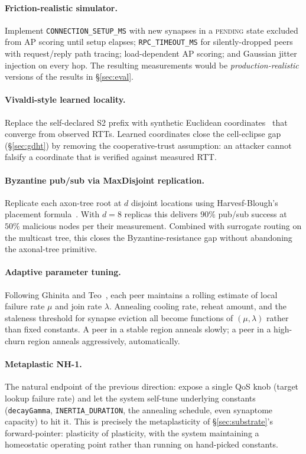\documentclass[conference]{IEEEtran}
\newcommand{\nhone}{NH-1\xspace}
\begin{document}
\paragraph{Friction-realistic simulator.} Implement
\texttt{CONNECTION\_SETUP\_MS} with new synapses in a
\textsc{pending} state excluded from AP scoring until setup elapses;
\texttt{RPC\_TIMEOUT\_MS} for silently-dropped peers with
request/reply path tracing; load-dependent AP scoring; and Gaussian
jitter injection on every hop. The resulting measurements would be
\emph{production-realistic} versions of the results in \S\ref{sec:eval}.

\paragraph{Vivaldi-style learned locality.} Replace the self-declared
S2 prefix with synthetic Euclidean coordinates~\cite{dabek2004vivaldi}
that converge from observed RTTs. Learned coordinates close the
cell-eclipse gap (\S\ref{sec:gdht}) by removing the cooperative-trust
assumption: an attacker cannot falsify a coordinate that is verified
against measured RTT.

\paragraph{Byzantine pub/sub via MaxDisjoint replication.} Replicate
each axon-tree root at $d$ disjoint locations using
Harvesf-Blough's placement formula~\cite{harvesf2007design}. With
$d = 8$ replicas this delivers $90\%$ pub/sub success at $50\%$
malicious nodes per their measurement. Combined with surrogate routing
on the multicast tree, this closes the Byzantine-resistance gap without
abandoning the axonal-tree primitive.

\paragraph{Adaptive parameter tuning.} Following Ghinita and
Teo~\cite{ghinita2006adaptive}, each peer maintains a rolling estimate
of local failure rate $\mu$ and join rate $\lambda$. Annealing cooling
rate, reheat amount, and the staleness threshold for synapse eviction
all become functions of $(\mu, \lambda)$ rather than fixed constants.
A peer in a stable region anneals slowly; a peer in a high-churn
region anneals aggressively, automatically.

\paragraph{Metaplastic \nhone.} The natural endpoint of the previous
direction: expose a single QoS knob (target lookup failure rate) and
let the system self-tune underlying constants
(\texttt{decayGamma}, \texttt{INERTIA\_DURATION}, the annealing
schedule, even synaptome capacity) to hit it. This is precisely the
metaplasticity of \S\ref{sec:substrate}'s
forward-pointer: plasticity of plasticity, with the system maintaining
a homeostatic operating point rather than running on hand-picked
constants.
\end{document}
